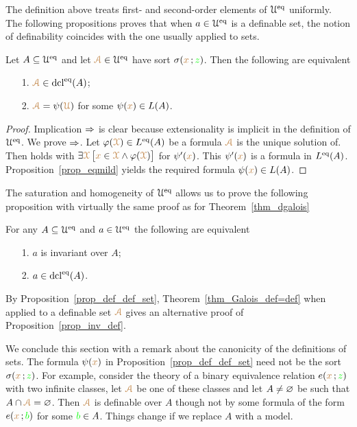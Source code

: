 \documentclass[creche.tex]{subfiles}
\begin{document}
The definition above treats first- and second-order elements of $\EuScript U^{{\rm eq}}$ uniformly.
The following propositions proves that when $a\in\EuScript U^{{\rm eq}}$ is a definable set, the notion of definability coincides with the one usually applied to sets.

\begin{proposition}\label{prop_def_def_set}
Let $A\subseteq\EuScript U^{{\rm eq}}$ and let ${\color{brown}\EuScript A}\in\EuScript U^{{\rm eq}}$ have sort $\sigma({\color{brown} x}\,;{\color{green} z})$.
Then the following are equivalent
\begin{itemize}
\item[1.] ${\color{brown}\EuScript A}\in\mathop{\rm dcl}^{{\rm eq}}(A)$;
\item[2.] ${\color{brown}\EuScript A}=\psi({\color{brown}\EuScript U})$ for some $\psi({\color{brown} x})\in L(A)$.
\end{itemize}
\end{proposition}

\begin{proof}
Implication $\Rightarrow$ is clear because extensionality is implicit in the definition of $\EuScript U^{{\rm eq}}$.
We prove $\Rightarrow$.
Let $\varphi({\color{brown}\EuScript X})\in L^{{\rm eq}}(A)$ be a formula ${\color{brown}\EuScript A}$ is the unique solution of.
Then  holds with $\exists {\color{brown}\EuScript X}\,\big[{\color{brown} x}\in {\color{brown}\EuScript X}\wedge\varphi({\color{brown}\EuScript X})\big]$ for $\psi'({\color{brown} x})$. This $\psi'({\color{brown} x})$ is a formula in $L^{{\rm eq}}(A)$. Proposition~\ref{prop_eqmild} yields the required formula $\psi({\color{brown} x})\in L(A)$.
\end{proof}

The saturation and homogeneity of $\EuScript U^{{\rm eq}}$ allows us to prove the following proposition with virtually the same proof as for Theorem~\ref{thm_dgalois}

\begin{theorem}\label{thm_Galois_def=def}
For any $A\subseteq\EuScript U^{{\rm eq}}$ and $a\in\EuScript U^{{\rm eq}}$ the following are equivalent
\begin{itemize}
\item[1.] $a$ is invariant over $A$;
\item[2.] $a\in\mathop{\rm dcl}^{{\rm eq}}(A)$.\QED
\end{itemize}
\end{theorem}

By Proposition~\ref{prop_def_def_set}, Theorem~\ref{thm_Galois_def=def} when applied to a definable set ${\color{brown}\EuScript A}$ gives an alternative proof of Proposition~\ref{prop_inv_def}.

We conclude this section with a remark about the canonicity of the definitions of sets.
The formula $\psi({\color{brown} x})$ in Proposition~\ref{prop_def_def_set} need not be the sort $\sigma({\color{brown} x}\,;{\color{green} z})$.
For example, consider the theory of a binary equivalence relation $e({\color{brown} x}\,;{\color{green} z})$ with two infinite classes, let ${\color{brown}\EuScript A}$ be one of these classes and let $A\neq\varnothing$ be such that $A\cap {\color{brown}\EuScript A}=\varnothing$.
Then ${\color{brown}\EuScript A}$ is definable over $A$ though not by some formula of the form $e({\color{brown} x}\,;{\color{green} b})$ for some ${\color{green} b}\in A$.
Things change if we replace $A$ with a model.
\end{document}
